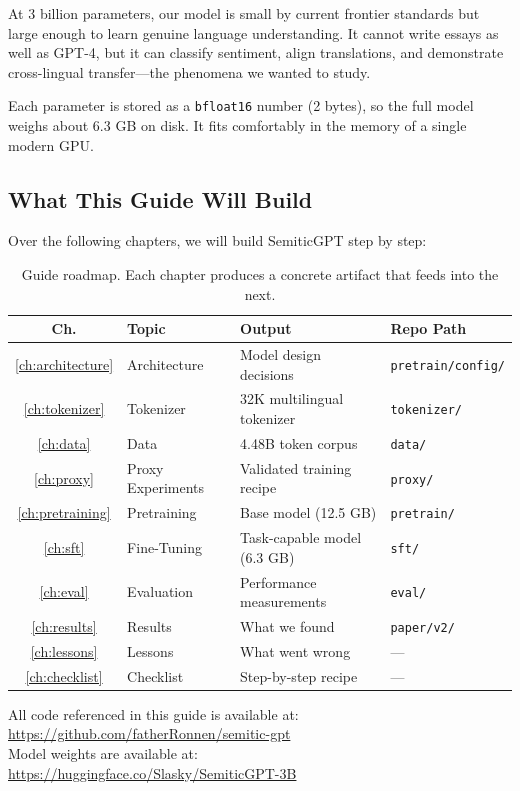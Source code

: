 \documentclass[11pt,a4paper]{article}
\begin{document}
At 3 billion parameters, our model is small by current frontier standards but large enough to learn genuine language understanding. It cannot write essays as well as GPT-4, but it can classify sentiment, align translations, and demonstrate cross-lingual transfer---the phenomena we wanted to study.

Each parameter is stored as a \texttt{bfloat16} number (2 bytes), so the full model weighs about 6.3 GB on disk. It fits comfortably in the memory of a single modern GPU.

\subsection{What This Guide Will Build}

Over the following chapters, we will build SemiticGPT step by step:

\begin{table}[H]
\centering
\begin{tabular}{clll}
\toprule
\textbf{Ch.} & \textbf{Topic} & \textbf{Output} & \textbf{Repo Path} \\
\midrule
\ref{ch:architecture} & Architecture & Model design decisions & \texttt{pretrain/config/} \\
\ref{ch:tokenizer} & Tokenizer & 32K multilingual tokenizer & \texttt{tokenizer/} \\
\ref{ch:data} & Data & 4.48B token corpus & \texttt{data/} \\
\ref{ch:proxy} & Proxy Experiments & Validated training recipe & \texttt{proxy/} \\
\ref{ch:pretraining} & Pretraining & Base model (12.5 GB) & \texttt{pretrain/} \\
\ref{ch:sft} & Fine-Tuning & Task-capable model (6.3 GB) & \texttt{sft/} \\
\ref{ch:eval} & Evaluation & Performance measurements & \texttt{eval/} \\
\ref{ch:results} & Results & What we found & \texttt{paper/v2/} \\
\ref{ch:lessons} & Lessons & What went wrong & --- \\
\ref{ch:checklist} & Checklist & Step-by-step recipe & --- \\
\bottomrule
\end{tabular}
\caption{Guide roadmap. Each chapter produces a concrete artifact that feeds into the next.}
\label{tab:roadmap}
\end{table}

\begin{reporef}
All code referenced in this guide is available at:\\
\url{https://github.com/fatherRonnen/semitic-gpt}\\[4pt]
Model weights are available at:\\
\url{https://huggingface.co/Slasky/SemiticGPT-3B}
\end{reporef}
\end{document}
